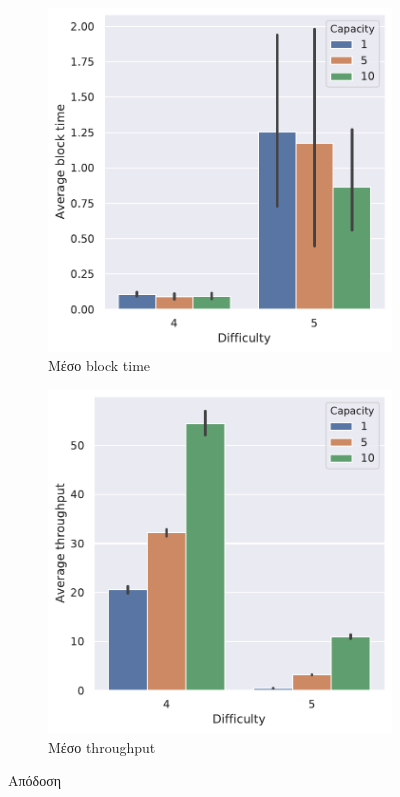 \documentclass[titlepage]{article}
\begin{document}
\begin{figure}[!ht]
    \begin{subfigure}{0.49\textwidth}
        \includegraphics[width=\textwidth]{efficiency_average_block_time.pdf}
        \caption{Μέσο block time}
    \end{subfigure}
    \begin{subfigure}{0.49\textwidth}
        \includegraphics[width=\textwidth]{efficiency_average_throughput.pdf}
        \caption{Μέσο throughput}
    \end{subfigure}
    \caption{Απόδοση}
\end{figure}
\end{document}
